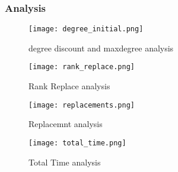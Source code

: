 \documentclass{beamer}
\begin{document}
\begin{frame}
\frametitle{Analysis}
\begin{minipage}{0.48\linewidth}
\begin{figure}[htb]
\texttt{[image: degree\_initial.png]}\\
\caption{degree discount and maxdegree analysis}
\label{fig:awesome_image}
\end{figure}
\begin{figure}[htb]
\texttt{[image: rank\_replace.png]}\\
\caption{Rank Replace analysis}
\label{fig:awesome_image}
\end{figure}
\end{minipage}
\begin{minipage}{0.50\linewidth}
\begin{figure}[htb]
\texttt{[image: replacements.png]}\\
\caption{Replacemnt analysis}
\label{fig:awesome_image}
\end{figure}
\begin{figure}[htb]
\texttt{[image: total\_time.png]}\\
\caption{Total Time analysis}
\label{fig:awesome_image}
\end{figure}




\end{minipage}
\end{frame}
\end{document}
